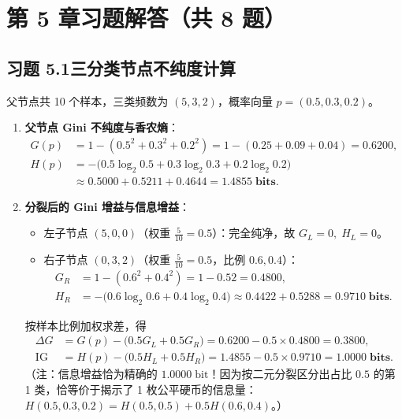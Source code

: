 \section*{第 5 章习题解答（共 8 题）}

\subsection*{习题 5.1\quad 三分类节点不纯度计算}
父节点共 10 个样本，三类频数为 $(5, 3, 2)$，概率向量 $p = (0.5, 0.3, 0.2)$。
\begin{enumerate}[label=(\arabic*), leftmargin=1.8em]
  \item \textbf{父节点 Gini 不纯度与香农熵}：
  \begin{align*}
    G(p) &= 1 - (0.5^2 + 0.3^2 + 0.2^2) = 1 - (0.25 + 0.09 + 0.04) = \mathbf{0.6200}, \\
    H(p) &= -\big(0.5\log_2 0.5 + 0.3\log_2 0.3 + 0.2\log_2 0.2\big) \\
         &\approx 0.5000 + 0.5211 + 0.4644 = \mathbf{1.4855\;\text{bits}}.
  \end{align*}
  \item \textbf{分裂后的 Gini 增益与信息增益}：
  \begin{itemize}
    \item 左子节点 $(5, 0, 0)$（权重 $\frac{5}{10} = 0.5$）：完全纯净，故 $G_L = 0,\; H_L = 0$。
    \item 右子节点 $(0, 3, 2)$（权重 $\frac{5}{10} = 0.5$，比例 $0.6, 0.4$）：
    \begin{align*}
      G_R &= 1 - (0.6^2 + 0.4^2) = 1 - 0.52 = \mathbf{0.4800}, \\
      H_R &= -\big(0.6\log_2 0.6 + 0.4\log_2 0.4\big) \approx 0.4422 + 0.5288 = \mathbf{0.9710\;\text{bits}}.
    \end{align*}
  \end{itemize}
  按样本比例加权求差，得
  \begin{align*}
    \Delta G &= G(p) - \big(0.5 G_L + 0.5 G_R\big) = 0.6200 - 0.5 \times 0.4800 = \mathbf{0.3800}, \\
    \operatorname{IG} &= H(p) - \big(0.5 H_L + 0.5 H_R\big) = 1.4855 - 0.5 \times 0.9710 = \mathbf{1.0000\;\text{bits}}.
  \end{align*}
  （注：信息增益恰为精确的 $1.0000\;\text{bit}$！因为按二元分裂区分出占比 $0.5$ 的第 1 类，恰等价于揭示了 1 枚公平硬币的信息量：$H(0.5, 0.3, 0.2) = H(0.5, 0.5) + 0.5 H(0.6, 0.4)$。）
\end{enumerate}

